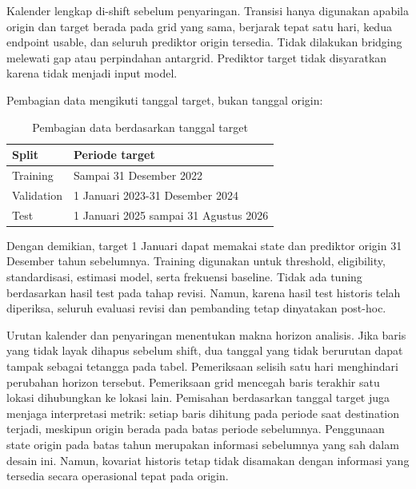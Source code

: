\documentclass[12pt,a4paper]{article}
\begin{document}
Kalender lengkap di-shift sebelum penyaringan. Transisi hanya digunakan apabila origin dan target berada pada grid yang sama, berjarak tepat satu hari, kedua endpoint usable, dan seluruh prediktor origin tersedia. Tidak dilakukan bridging melewati gap atau perpindahan antargrid. Prediktor target tidak disyaratkan karena tidak menjadi input model.


Pembagian data mengikuti tanggal target, bukan tanggal origin:


\begin{table}[!htbp]

\centering

\caption{Pembagian data berdasarkan tanggal target}\label{tab:3}

\fontsize{9.5}{11.5}\selectfont

\begin{tabularx}{\columnwidth}{@{}>{\raggedright\arraybackslash}p{}Y@{}}

\toprule

\textbf{Split} & \textbf{Periode target} \\

\midrule

Training & Sampai 31 Desember 2022 \\

Validation & 1 Januari 2023-31 Desember 2024 \\

Test & 1 Januari 2025 sampai 31 Agustus 2026 \\

\bottomrule

\end{tabularx}

\end{table}

Dengan demikian, target 1 Januari dapat memakai state dan prediktor origin 31 Desember tahun sebelumnya. Training digunakan untuk threshold, eligibility, standardisasi, estimasi model, serta frekuensi baseline. Tidak ada tuning berdasarkan hasil test pada tahap revisi. Namun, karena hasil test historis telah diperiksa, seluruh evaluasi revisi dan pembanding tetap dinyatakan post-hoc.


Urutan kalender dan penyaringan menentukan makna horizon analisis. Jika baris yang tidak layak dihapus sebelum shift, dua tanggal yang tidak berurutan dapat tampak sebagai tetangga pada tabel. Pemeriksaan selisih satu hari menghindari perubahan horizon tersebut. Pemeriksaan grid mencegah baris terakhir satu lokasi dihubungkan ke lokasi lain. Pemisahan berdasarkan tanggal target juga menjaga interpretasi metrik: setiap baris dihitung pada periode saat destination terjadi, meskipun origin berada pada batas periode sebelumnya. Penggunaan state origin pada batas tahun merupakan informasi sebelumnya yang sah dalam desain ini. Namun, kovariat historis tetap tidak disamakan dengan informasi yang tersedia secara operasional tepat pada origin.
\end{document}
